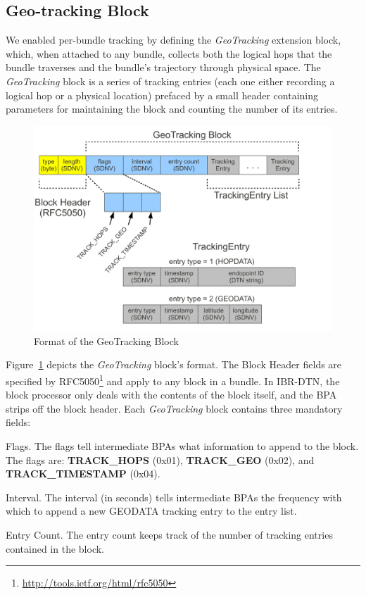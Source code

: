 \subsection{Geo-tracking Block}
We enabled per-bundle tracking by defining the {\em GeoTracking} extension block, which, when attached to any bundle, collects both the logical hops that the bundle traverses and the bundle's trajectory through physical space. The {\em GeoTracking} block is a series of tracking entries (each one either recording a logical hop or a physical location) prefaced by a small header containing parameters for maintaining the block and counting the number of its entries.
\begin{figure}
\begin{center}
\includegraphics[width=\columnwidth]{figures/tracking-block.pdf}
\end{center}
\caption{Format of the GeoTracking Block}
\label{fig:tracking-block}
\end{figure}

\begin{sloppypar}
Figure~\ref{fig:tracking-block} depicts the {\em GeoTracking} block's format. The Block Header fields are specified by RFC5050\footnote{\scriptsize\url{http://tools.ietf.org/html/rfc5050}} and apply to any block in a bundle. In IBR-DTN, the block processor only deals with the contents of the block itself, and the BPA strips off the block header. Each {\em GeoTracking} block contains three mandatory fields:
\begin{description*}
  \item[Flags.] The flags tell intermediate BPAs what information to append to the block. The flags are: {\bf TRACK\_HOPS} (0x01), {\bf TRACK\_GEO} (0x02), and {\bf TRACK\_TIMESTAMP} (0x04).
  \item[Interval.] The interval (in seconds) tells intermediate BPAs the frequency with which to append a new GEODATA tracking entry to the entry list.  
  \item[Entry Count.] The entry count keeps track of the number of tracking entries contained in the block.
\end{description*}
\end{sloppypar}

